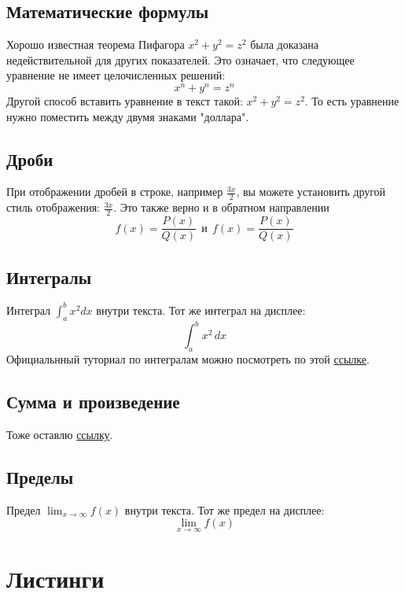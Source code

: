     \subsection{Математические формулы}
    Хорошо известная теорема Пифагора \(x^2 + y^2 = z^2\) была
    доказана недействительной для других показателей.
    Это означает, что следующее уравнение не имеет целочисленных решений:
    \[ x^n + y^n = z^n \]
    Другой способ вставить уравнение в текст такой: $x^2 + y^2 = z^2$. То есть уравнение нужно поместить между двумя знаками "доллара".

    \subsection{Дроби}
    При отображении дробей в строке, например \(\frac{3x}{2}\),
    вы можете установить другой стиль отображения:
    \( \displaystyle \frac{3x}{2} \).
    Это также верно и в обратном направлении
    \[ f(x)=\frac{P(x)}{Q(x)} \ \ \textrm{и}
    \ \ f(x)=\textstyle\frac{P(x)}{Q(x)} \]

    \subsection{Интегралы}
    Интеграл \(\int_{a}^{b} x^2 dx\) внутри текста.
    \medskip
    Тот же интеграл на дисплее:
    \[
    \int_{a}^{b} x^2 \,dx
    \]
    Официальнный туториал по интегралам можно посмотреть по этой  \href{https://www.overleaf.com/learn/latex/Integrals,_sums_and_limits#Integrals}{ссылке}.

    \subsection{Сумма и произведение}
    Тоже оставлю \href{https://www.overleaf.com/learn/latex/Integrals,_sums_and_limits#Sums_and_products}{ссылку}.
    
    \subsection{Пределы}
    
    Предел \(\lim_{x\to\infty} f(x)\) внутри текста.
    Тот же предел на дисплее:
    \[
    \lim_{x\to\infty} f(x)
    \]

\section{Листинги}

